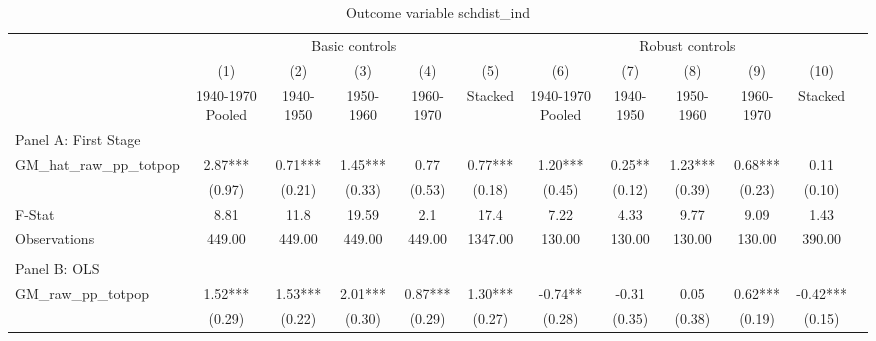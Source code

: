  \begin{table}[htbp]\centering {} \begin{threeparttable} \caption{Outcome variable schdist\_ind} \begin{tabular}{l*{11}{c}} \toprule
          &\multicolumn{5}{c}{Basic controls}                                   &\multicolumn{5}{c}{Robust controls}                                  \\\cmidrule(lr){2-6}\cmidrule(lr){7-11}
          &\multicolumn{1}{c}{(1)}&\multicolumn{1}{c}{(2)}&\multicolumn{1}{c}{(3)}&\multicolumn{1}{c}{(4)}&\multicolumn{1}{c}{(5)}&\multicolumn{1}{c}{(6)}&\multicolumn{1}{c}{(7)}&\multicolumn{1}{c}{(8)}&\multicolumn{1}{c}{(9)}&\multicolumn{1}{c}{(10)}\\
          &\multicolumn{1}{c}{1940-1970 Pooled}&\multicolumn{1}{c}{1940-1950}&\multicolumn{1}{c}{1950-1960}&\multicolumn{1}{c}{1960-1970}&\multicolumn{1}{c}{Stacked}&\multicolumn{1}{c}{1940-1970 Pooled}&\multicolumn{1}{c}{1940-1950}&\multicolumn{1}{c}{1950-1960}&\multicolumn{1}{c}{1960-1970}&\multicolumn{1}{c}{Stacked}\\
\cmidrule(lr){1-11}
\multicolumn{10}{l}{Panel A: First Stage}\\
\cmidrule(lr){1-11}
GM\_hat\_raw\_pp\_totpop&      2.87***&      0.71***&      1.45***&      0.77   &      0.77***&      1.20***&      0.25** &      1.23***&      0.68***&      0.11   \\
          &    (0.97)   &    (0.21)   &    (0.33)   &    (0.53)   &    (0.18)   &    (0.45)   &    (0.12)   &    (0.39)   &    (0.23)   &    (0.10)   \\
\midrule
F-Stat    &      8.81   &      11.8   &     19.59   &       2.1   &      17.4   &      7.22   &      4.33   &      9.77   &      9.09   &      1.43   \\
Observations&    449.00   &    449.00   &    449.00   &    449.00   &   1347.00   &    130.00   &    130.00   &    130.00   &    130.00   &    390.00   \\
\cmidrule[\heavyrulewidth](lr){1-11} \\ \cmidrule[\heavyrulewidth](lr){1-11}
\multicolumn{10}{l}{Panel B: OLS}\\
\cmidrule(lr){1-11}
GM\_raw\_pp\_totpop&      1.52***&      1.53***&      2.01***&      0.87***&      1.30***&     -0.74** &     -0.31   &      0.05   &      0.62***&     -0.42***\\
          &    (0.29)   &    (0.22)   &    (0.30)   &    (0.29)   &    (0.27)   &    (0.28)   &    (0.35)   &    (0.38)   &    (0.19)   &    (0.15)   \\

\end{tabular}
\end{threeparttable}
\end{table}
